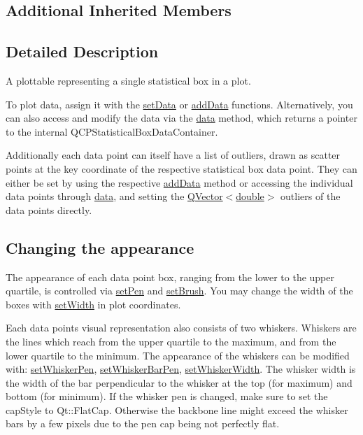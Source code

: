 \subsection*{Additional Inherited Members}


\subsection{Detailed Description}
A plottable representing a single statistical box in a plot. 



To plot data, assign it with the \hyperlink{class_q_c_p_statistical_box_a08a6da55822bad825ee25a8069b9b52f}{set\+Data} or \hyperlink{class_q_c_p_statistical_box_a9a8739c5b8291db8fd839e892fc8f478}{add\+Data} functions. Alternatively, you can also access and modify the data via the \hyperlink{class_q_c_p_statistical_box_a728e501413eaf191544014173d52dfbc}{data} method, which returns a pointer to the internal Q\+C\+P\+Statistical\+Box\+Data\+Container.

Additionally each data point can itself have a list of outliers, drawn as scatter points at the key coordinate of the respective statistical box data point. They can either be set by using the respective \hyperlink{class_q_c_p_statistical_box_a026f2790b530d6f29312254ecb1e7c1e}{add\+Data} method or accessing the individual data points through \hyperlink{class_q_c_p_statistical_box_a728e501413eaf191544014173d52dfbc}{data}, and setting the {\ttfamily \hyperlink{class_q_vector}{Q\+Vector$<$double$>$} outliers} of the data points directly.\hypertarget{class_q_c_p_statistical_box_qcpstatisticalbox-appearance}{}\subsection{Changing the appearance}\label{class_q_c_p_statistical_box_qcpstatisticalbox-appearance}
The appearance of each data point box, ranging from the lower to the upper quartile, is controlled via \hyperlink{class_q_c_p_abstract_plottable_ab74b09ae4c0e7e13142fe4b5bf46cac7}{set\+Pen} and \hyperlink{class_q_c_p_abstract_plottable_a7a4b92144dca6453a1f0f210e27edc74}{set\+Brush}. You may change the width of the boxes with \hyperlink{class_q_c_p_statistical_box_a0b62775bd67301b1eba5c785f2b26f14}{set\+Width} in plot coordinates.

Each data point\textquotesingle{}s visual representation also consists of two whiskers. Whiskers are the lines which reach from the upper quartile to the maximum, and from the lower quartile to the minimum. The appearance of the whiskers can be modified with\+: \hyperlink{class_q_c_p_statistical_box_a4a5034cb3b9b040444df05ab1684620b}{set\+Whisker\+Pen}, \hyperlink{class_q_c_p_statistical_box_aa8d3e503897788e1abf68dc74b5f147f}{set\+Whisker\+Bar\+Pen}, \hyperlink{class_q_c_p_statistical_box_adf378812446bd66f34d1f7f293d991cd}{set\+Whisker\+Width}. The whisker width is the width of the bar perpendicular to the whisker at the top (for maximum) and bottom (for minimum). If the whisker pen is changed, make sure to set the {\ttfamily cap\+Style} to {\ttfamily Qt\+::\+Flat\+Cap}. Otherwise the backbone line might exceed the whisker bars by a few pixels due to the pen cap being not perfectly flat.

